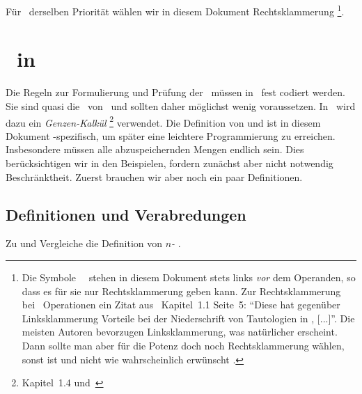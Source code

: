 Für \Operationen\ derselben Priorität wählen wir in diesem Dokument Rechtsklammerung%
\footnote{%
	Die Symbole \unaerer\ \Operationen\ stehen in diesem Dokument stets links \emph{vor} dem Operanden, so dass es für sie nur Rechtsklammerung geben kann.
	Zur Rechtsklammerung bei \binaeren\ Operationen ein Zitat aus~\cite{bib:Rautenberg} Kapitel~1.1 Seite~5:
	"`Diese hat gegenüber Linksklammerung Vorteile bei der Niederschrift von Tautologien in \OjkImp, [...]"'.
	Die meisten Autoren bevorzugen Linksklammerung, was natürlicher erscheint.
	Dann sollte man aber für die Potenz doch noch Rechtsklammerung wählen, sonst ist  und nicht wie wahrscheinlich erwünscht .
}.

\section[Beweise in ASBA]{\Beweise\ in \ASBA}%
\label                {sec:BeweiseASBA}

Die Regeln zur Formulierung und Prüfung der \Beweise\ müssen in \ASBA\ fest codiert werden.
Sie sind quasi die \Axiome\ von \ASBA\ und sollten daher möglichst wenig voraussetzen.
In \ASBA\ wird dazu ein \emph{Genzen-Kalkül}%
\footnote{%
	 Kapitel~1.4 und~\cite{bib:Schlussregel,bib:NatuerlichesSchliessen}
} verwendet.
Die Definition von \emph{\Schlussregel} und \emph{\Beweis} ist in diesem Dokument \ASBA-spezifisch, um später eine leichtere Programmierung zu erreichen.
Insbesondere müssen alle abzuspeichernden Mengen endlich sein.
Dies berücksichtigen wir in den Beispielen, fordern zunächst aber nicht notwendig Beschränktheit.
Zuerst brauchen wir aber noch ein paar Definitionen.

\subsection{Definitionen und Verabredungen}%
\label                  {sub:Verabredungen}

Zu \chrqt{\MtsLen} und \chrqt{\MtsSet} Vergleiche die Definition von \emph{$n$-\Tupel} .

